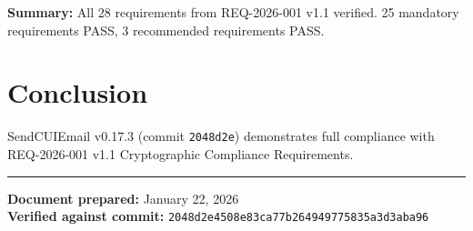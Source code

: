 \documentclass[11pt,letterpaper]{article}
\begin{document}
\normalsize

\textbf{Summary:} All 28 requirements from REQ-2026-001 v1.1 verified. 25 mandatory requirements PASS, 3 recommended requirements PASS.

\section{Conclusion}

SendCUIEmail v0.17.3 (commit \texttt{2048d2e}) demonstrates full compliance with REQ-2026-001 v1.1 Cryptographic Compliance Requirements.

\vspace{24pt}

\noindent\rule{\textwidth}{0.5pt}

\textbf{Document prepared:} January 22, 2026 \\
\textbf{Verified against commit:} \texttt{2048d2e4508e83ca77b264949775835a3d3aba96}
\end{document}
